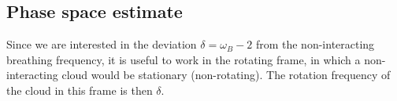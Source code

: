 \documentclass[aps,preprintnumbers,onecolumn,amsmath,amssymb,floatfix,pra]{revtex4-1}
\begin{document}
\subsection{Phase space estimate}

Since we are interested in the deviation $\delta=\omega_B-2$ from the non-interacting breathing
frequency, it is useful to work in the rotating frame, in which a non-interacting cloud would be
stationary (non-rotating).  The rotation frequency of the cloud in this frame is then $\delta$.


\begin{figure}[h
]
\end{figure}
\end{document}
